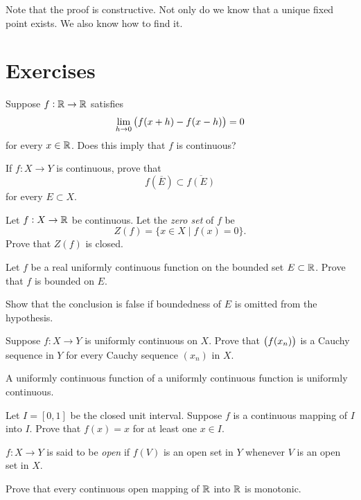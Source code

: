Note that the proof is constructive. Not only do we know that a unique fixed point exists. We also know how to find it.
\pagebreak

\section*{Exercises}
\begin{exercise}
Suppose $f:\mathbb R\to\mathbb R$ satisfies
\[\lim_{h\to0}\left(f(x+h)-f(x-h)\right)=0\]
for every $x\in\mathbb R$. Does this imply that $f$ is continuous?
\end{exercise}

\begin{exercise}
If $f:X\to Y$ is continuous, prove that
\[f(\overline{E})\subset\overline{f(E)}\]
for every $E\subset X$.
\end{exercise}

\begin{exercise}
Let $f:X\to\mathbb R$ be continuous. Let the \emph{zero set} of $f$ be
\[Z(f)=\{x\in X\mid f(x)=0\}.\]
Prove that $Z(f)$ is closed.
\end{exercise}

\begin{exercise}
Let $f$ be a real uniformly continuous function on the bounded set $E\subset\mathbb R$. Prove that $f$ is bounded on $E$.

Show that the conclusion is false if boundedness of $E$ is omitted from the hypothesis.
\end{exercise}

\begin{exercise}
Suppose $f:X\to Y$ is uniformly continuous on $X$. Prove that $\left(f(x_n)\right)$ is a Cauchy sequence in $Y$ for every Cauchy sequence $(x_n)$ in $X$.
\end{exercise}

\begin{exercise}
A uniformly continuous function of a uniformly continuous function is uniformly continuous.
\end{exercise}

\begin{exercise}
Let $I=[0,1]$ be the closed unit interval. Suppose $f$ is a continuous mapping of $I$ into $I$. Prove that $f(x)=x$ for at least one $x\in I$. 
\end{exercise}

\begin{exercise}
$f:X\to Y$ is said to be \emph{open} if $f(V)$ is an open set in $Y$ whenever $V$ is an open set in $X$.

Prove that every continuous open mapping of $\mathbb R$ into $\mathbb R$ is monotonic.
\end{exercise}

